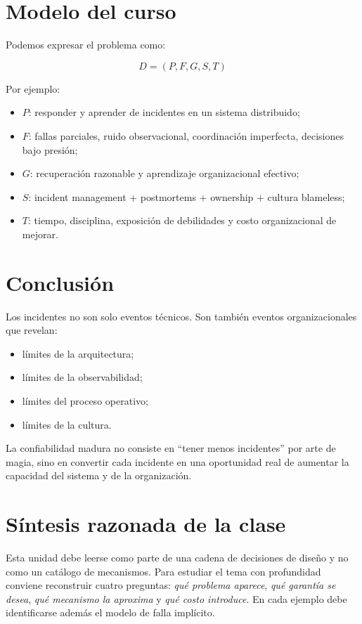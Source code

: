 \documentclass[variant=apuntes,cover=institutional,mode=screen]{ua-engineering-v6-article}
\begin{document}
\section{Modelo del curso}

Podemos expresar el problema como:

\[
D = (P, F, G, S, T)
\]

Por ejemplo:
\begin{itemize}
\item $P$: responder y aprender de incidentes en un sistema distribuido;
\item $F$: fallas parciales, ruido observacional, coordinación imperfecta, decisiones bajo presión;
\item $G$: recuperación razonable y aprendizaje organizacional efectivo;
\item $S$: incident management + postmortems + ownership + cultura blameless;
\item $T$: tiempo, disciplina, exposición de debilidades y costo organizacional de mejorar.
\end{itemize}

\section{Conclusión}

Los incidentes no son solo eventos técnicos. Son también eventos organizacionales que revelan:
\begin{itemize}
\item límites de la arquitectura;
\item límites de la observabilidad;
\item límites del proceso operativo;
\item límites de la cultura.
\end{itemize}

\begin{uakeybox}
La confiabilidad madura no consiste en “tener menos incidentes” por arte de magia, sino en convertir cada incidente en una oportunidad real de aumentar la capacidad del sistema y de la organización.
\end{uakeybox}


\section{Síntesis razonada de la clase}
Esta unidad debe leerse como parte de una cadena de decisiones de diseño y no como un catálogo de mecanismos. Para estudiar el tema con profundidad conviene reconstruir cuatro preguntas: \emph{qué problema aparece}, \emph{qué garantía se desea}, \emph{qué mecanismo la aproxima} y \emph{qué costo introduce}. En cada ejemplo debe identificarse además el modelo de falla implícito.
\end{document}
